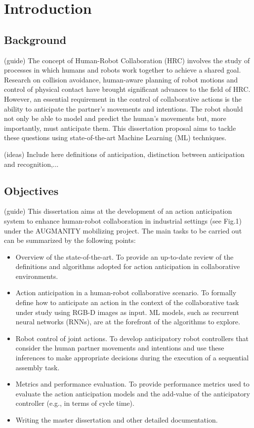 \chapter{Introduction}
\label{chapter:introduction}

\section{Background}

{\color{red}
(guide) The concept of Human-Robot Collaboration (HRC) involves the study of processes in which humans and robots work together to achieve a shared goal. Research on collision avoidance, human-aware planning of robot motions and control of physical contact have brought significant advances to the field of HRC. However, an essential requirement in the control of collaborative actions is the ability to anticipate the partner’s movements and intentions. The robot should not only be able to model and predict the human’s movements but, more importantly, must anticipate them. This dissertation proposal aims to tackle these questions using state-of-the-art Machine Learning (ML) techniques.
}

{\color{gray}
(ideas) Include here definitions of anticipation, distinction between anticipation and recognition,...
}

\section{Objectives}

{\color{red}
(guide) This dissertation aims at the development of an action anticipation system to enhance human-robot collaboration in industrial settings (see Fig.1) under the AUGMANITY mobilizing project. The main tasks to be carried out can be summarized by the following points:
\begin{itemize}
\item Overview of the state-of-the-art. To provide an up-to-date review of the definitions and algorithms adopted for action anticipation in collaborative environments.
\item Action anticipation in a human-robot collaborative scenario. To formally define how to anticipate an action in the context of the collaborative task under study using RGB-D images as input. ML models, such as recurrent neural networks (RNNs), are at the forefront of the algorithms to explore.
\item Robot control of joint actions. To develop anticipatory robot controllers that consider the human partner movements and intentions and use these inferences to make appropriate decisions during the execution of a sequential assembly task.
\item Metrics and performance evaluation. To provide performance metrics used to evaluate the action anticipation models and the add-value of the anticipatory controller (e.g., in terms of cycle time).
\item Writing the master dissertation and other detailed documentation.
\end{itemize}
}